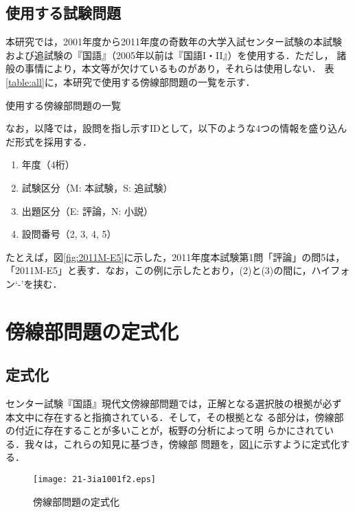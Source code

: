 \documentclass[japanese]{jnlp_1.4}
\begin{document}
\subsection*{使用する試験問題}

本研究では，2001年度から2011年度の奇数年の大学入試センター試験の本試験
および追試験の『国語』（2005年以前は『国語I・II』）を使用する．ただし，
諸般の事情により，本文等が欠けているものがあり，それらは使用しない．
表\ref{table:all}に，本研究で使用する傍線部問題の一覧を示す．

\begin{table}[t]
\caption{使用する傍線部問題の一覧}
\label{table:all}

\end{table}

なお，以降では，設問を指し示すIDとして，以下のような4つの情報を盛り込んだ形式を採用する．
\begin{enumerate}
\item 年度（4桁）
\item 試験区分（M: 本試験，S: 追試験）
\item 出題区分（E: 評論，N: 小説） 
\item 設問番号（2, 3, 4, 5）
\end{enumerate}
たとえば，図\ref{fig:2011M-E5}に示した，2011年度本試験第1問「評論」の問5は，
「2011M-E5」と表す．なお，この例に示したとおり，(2)と(3)の間に，ハイフォン`-'を挟む．


\section{傍線部問題の定式化}


\subsection{定式化}

センター試験『国語』現代文傍線部問題では，正解となる選択肢の根拠が必ず
本文中に存在すると指摘されている\cite{Funaguchi}．そして，その根拠とな
る部分は，傍線部の付近に存在することが多いことが，板野の分析によって明
らかにされている\cite{Itano2010}．我々は，これらの知見に基づき，傍線部
問題を，図\ref{fig:formalization}に示すように定式化する．

\begin{figure}[t]
\begin{center}
\texttt{[image: 21-3ia1001f2.eps]}
\end{center}
\caption{傍線部問題の定式化}
\label{fig:formalization}
\end{figure}
\end{document}
